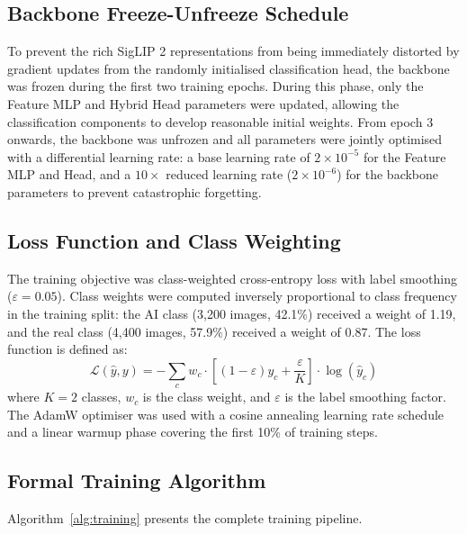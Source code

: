 \subsection{Backbone Freeze-Unfreeze Schedule}

To prevent the rich SigLIP 2 representations from being immediately distorted by gradient updates from the randomly initialised classification head, the backbone was frozen during the first two training epochs. During this phase, only the Feature MLP and Hybrid Head parameters were updated, allowing the classification components to develop reasonable initial weights. From epoch 3 onwards, the backbone was unfrozen and all parameters were jointly optimised with a differential learning rate: a base learning rate of $2 \times 10^{-5}$ for the Feature MLP and Head, and a $10\times$ reduced learning rate ($2 \times 10^{-6}$) for the backbone parameters to prevent catastrophic forgetting.

\subsection{Loss Function and Class Weighting}

The training objective was class-weighted cross-entropy loss with label smoothing ($\varepsilon = 0.05$). Class weights were computed inversely proportional to class frequency in the training split: the AI class (3,200 images, 42.1\%) received a weight of 1.19, and the real class (4,400 images, 57.9\%) received a weight of 0.87. The loss function is defined as:
\begin{equation}
    \mathcal{L}(\hat{y}, y) = -\sum_{c} w_c \cdot \left[(1-\varepsilon) y_c + \frac{\varepsilon}{K}\right] \cdot \log(\hat{y}_c)
\end{equation}
where $K = 2$ classes, $w_c$ is the class weight, and $\varepsilon$ is the label smoothing factor. The AdamW optimiser was used with a cosine annealing learning rate schedule and a linear warmup phase covering the first 10\% of training steps.

\subsection{Formal Training Algorithm}

Algorithm~\ref{alg:training} presents the complete training pipeline.

